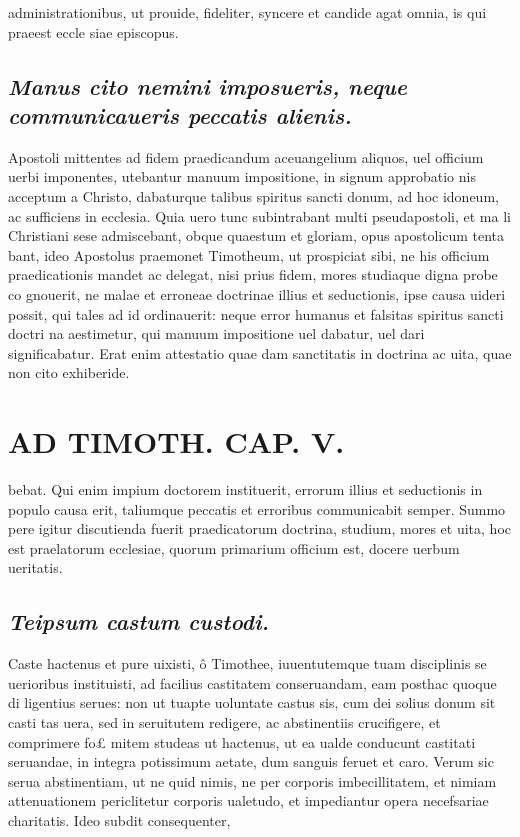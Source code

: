 \documentclass{article}
\begin{document}
\begin{pages}
administrationibus, ut prouide, fideliter, syncere et candide agat omnia, is qui praeest eccle siae episcopus.  \pend
{}
{}
\subsection*{\textit{Manus cito nemini imposueris, neque communicaueris peccatis alienis. }}\pstart Apostoli mittentes ad fidem praedicandum aceuangelium aliquos, uel officium uerbi imponentes, utebantur manuum impositione, in signum approbatio nis acceptum a Christo, dabaturque talibus spiritus sancti donum, ad hoc idoneum, ac sufficiens in ecclesia. Quia uero tunc subintrabant multi pseudapostoli, et ma li Christiani sese admiscebant, obque quaestum et gloriam, opus apostolicum tenta bant, ideo Apostolus praemonet Timotheum, ut prospiciat sibi, ne his officium praedicationis mandet ac delegat, nisi prius fidem, mores studiaque digna probe co gnouerit, ne malae et erroneae doctrinae illius et seductionis, ipse causa uideri possit, qui tales ad id ordinauerit: neque error humanus et falsitas spiritus sancti doctri na aestimetur, qui manuum impositione uel dabatur, uel dari significabatur. Erat enim attestatio quae dam sanctitatis in doctrina ac uita, quae non cito exhiberide.  \pend
\section*{AD TIMOTH. CAP. V. }
\marginpar{[ p.527 ]}\pstart bebat. Qui enim impium doctorem instituerit, errorum illius et seductionis in populo causa erit, taliumque peccatis et erroribus communicabit semper. Summo pere igitur discutienda fuerit praedicatorum doctrina, studium, mores et uita, hoc est praelatorum ecclesiae, quorum primarium officium est, docere uerbum ueritatis.  \pend
{}
{}
\subsection*{\textit{Teipsum castum custodi. }}\pstart Caste hactenus et pure uixisti, ô Timothee, iuuentutemque tuam disciplinis se uerioribus instituisti, ad facilius castitatem conseruandam, eam posthac quoque di ligentius serues: non ut tuapte uoluntate castus sis, cum dei solius donum sit casti tas uera, sed in seruitutem redigere, ac abstinentiis crucifigere, et comprimere fo£ mitem studeas ut hactenus, ut ea ualde conducunt castitati seruandae, in integra potissimum aetate, dum sanguis feruet et caro. Verum sic serua abstinentiam, ut ne quid nimis, ne per corporis imbecillitatem, et nimiam attenuationem periclitetur corporis ualetudo, et impediantur opera necefsariae charitatis. Ideo subdit consequenter,  \pend
{}
{}

\end{pages}
\end{document}
